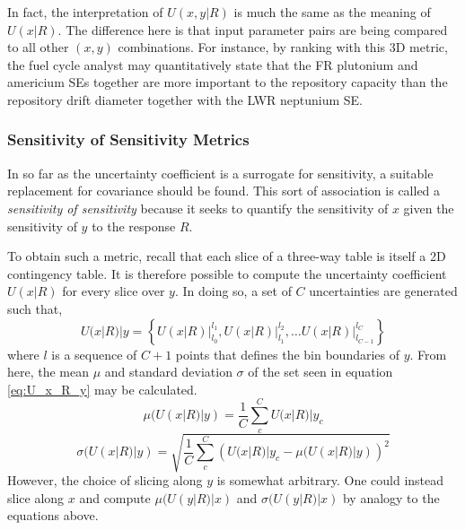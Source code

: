 In fact, the interpretation of $U(x,y|R)$ is much the same as the meaning of $U(x|R)$.  
The difference here is that input parameter pairs are being compared to
all other $(x, y)$ combinations.  For instance, by ranking with this 3D metric, the fuel 
cycle analyst may quantitatively state that the FR plutonium and americium SEs
together are more important to the repository capacity than the repository drift diameter 
together with the LWR neptunium SE.


\subsubsection{Sensitivity of Sensitivity Metrics}
\label{cts_sec:sensitivity_of_sensitivity_metrics}

In so far as the uncertainty coefficient is a surrogate for sensitivity, a suitable 
replacement for covariance should be found.
This sort of association is called a \emph{sensitivity of sensitivity} because it seeks
to quantify the sensitivity of $x$ given the sensitivity of  $y$ to the response $R$.

To obtain such a metric, recall that each slice of a three-way table is itself a 2D contingency table.  
It is therefore possible to compute the uncertainty
coefficient $U(x|R)$ for every slice over $y$.  In doing so, a set of $C$ uncertainties are generated 
such that,
\begin{equation}
\label{eq:U_x_R_y}
U(x|R)|y = \left\{ \left.U(x|R)\right|_{l_0}^{l_1}, \left.U(x|R)\right|_{l_1}^{l_2}, \ldots \left.U(x|R)\right|_{l_{C-1}}^{l_C}  \right\}
\end{equation}
where $l$ is a sequence of $C+1$ points that defines the bin boundaries of $y$.
From here, the mean $\mu$ and standard deviation $\sigma$ of the set seen in equation \ref{eq:U_x_R_y} may be 
calculated.
\begin{equation}
\mu(U(x|R)|y) = \frac{1}{C} \sum_c^C U(x|R)|y_c 
\end{equation}
\begin{equation}
\sigma(U(x|R)|y) = \sqrt{ \frac{1}{C} \sum_c^C \left( U(x|R)|y_c - \mu(U(x|R)|y) \right)^2 } 
\end{equation}
However, the choice of slicing along $y$ is somewhat arbitrary.  One could instead slice along $x$ 
and compute $\mu(U(y|R)|x)$ and $\sigma(U(y|R)|x)$
by analogy to the equations above.

